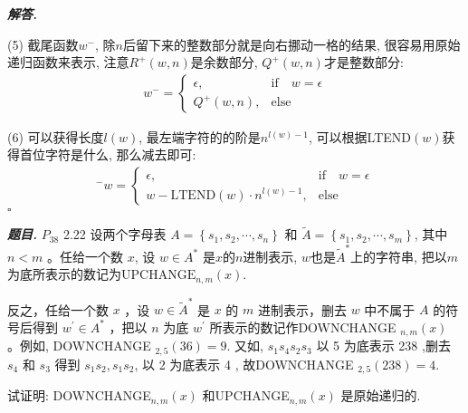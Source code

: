 \documentclass[10pt, a4paper, oneside]{ctexart}
\newenvironment{problem}{\begin{framed}\par\noindent\textbf{\textit{题目. }}}{\end{framed}\par}
\newenvironment{solution}{%
  \par\noindent\textbf{\textit{解答. }}\ignorespaces
}{%
  \hfill\ensuremath{\square}\par
}
\begin{document}
\begin{solution}
(5) 截尾函数$w^-$, 除$n$后留下来的整数部分就是向右挪动一格的结果, 很容易用原始递归函数来表示, 注意$R^+(w,n)$是余数部分, $Q^+(w,n)$才是整数部分:
\begin{align*}
    w^{-}=\begin{cases}
        \epsilon,& \text{if}\quad w=\epsilon\\
        Q^{+}(w,n), &\text{else}
    \end{cases}
\end{align*}

(6) 可以获得长度$l(w)$, 最左端字符的的阶是$n^{l(w)-1}$, 可以根据LTEND$(w)$获得首位字符是什么, 那么减去即可:
\begin{align*}
    ^-w=\begin{cases}
        \epsilon, &\text{if}\quad w=\epsilon\\
        w-\text{LTEND}(w)\cdot n^{l(w)-1}, &\text{else}
    \end{cases}
\end{align*}
\end{solution}

\begin{problem}
    $P_{38}$ 2.22 设两个字母表 $A=\left\{s_1, s_2, \cdots, s_n\right\}$ 和 $\tilde{A}=\left\{s_1, s_2, \cdots, s_m\right\}$, 其中 $n<m$ 。任给一个数 $x$, 设 $w \in A^*$ 是$x$的$n$进制表示, $w$也是$\tilde{A}^*$上的字符串, 把以$m$为底所表示的数记为$\text{UPCHANGE}_{n,m}(x)$.

    反之，任给一个数 $x$ ，设 $w \in \tilde{A}^*$ 是 $x$ 的 $m$ 进制表示，删去 $w$ 中不属于 $A$ 的符号后得到 $w^{\prime} \in A^*$ ，把以 $n$ 为底 $w^{\prime}$ 所表示的数记作DOWNCHANGE ${ }_{n, m}(x)$ 。例如, DOWNCHANGE ${ }_{2,5}(36)=9$. 又如, $s_1 s_4 s_2 s_3$ 以 5 为底表示 238 ,删去 $s_4$ 和 $s_3$ 得到 $s_1 s_2, s_1 s_2$, 以 2 为底表示 4 , 故DOWNCHANGE ${ }_{2,5}(238)=4$.
    
    试证明: DOWNCHANGE$_{n, m}(x)$ 和UPCHANGE$_{n, m}(x)$ 是原始递归的.
\end{problem}
\end{document}
